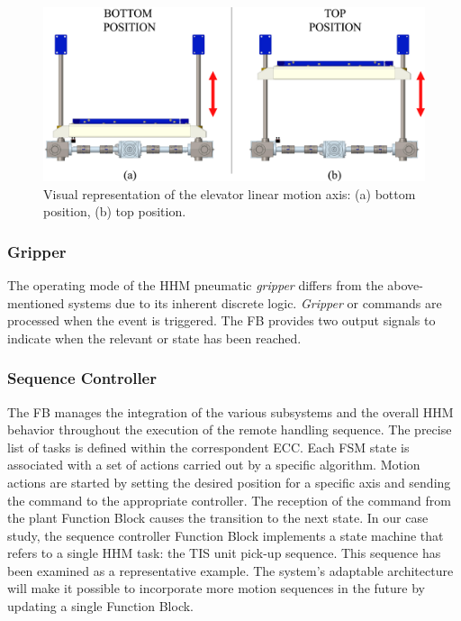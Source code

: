 \begin{bibunit}
\begin{figure}[h!]
    \centering
    \includegraphics[width=\columnwidth]{MX_Papers/Paper4/pictures/lilli07.eps}
    \caption{Visual representation of the elevator linear motion axis: (a) bottom position, (b) top position. } 
    \label{fig:elevator}
\end{figure}

\subsubsection{Gripper}
The operating mode of the HHM pneumatic \textit{gripper} differs from the above-mentioned systems due to its inherent discrete logic. 
\textit{Gripper}  or  commands are processed when the  event is triggered. The FB provides two output signals to indicate when the relevant  or  state has been reached. 

\subsubsection{Sequence Controller}
The  FB manages the integration of the various subsystems and the overall HHM behavior throughout the execution of the remote handling sequence. The precise list of tasks is defined within the correspondent ECC. 
Each FSM state is associated with a set of actions carried out by a specific algorithm. Motion actions are started by setting the desired position for a specific axis and sending the  command to the appropriate controller. The reception of the  command from the plant Function Block causes the transition to the next state. In our case study, the sequence controller Function Block implements a state machine that refers to a single HHM task: the TIS unit pick-up sequence. This sequence has been examined as a representative example. The system's adaptable architecture will make it possible to incorporate more motion sequences in the future by updating a single Function Block.


\end{bibunit}
